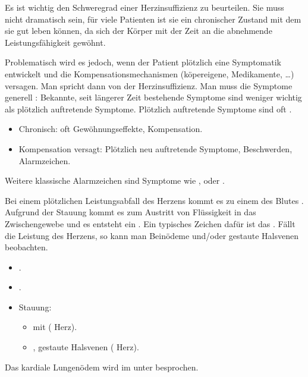 {%
Es ist wichtig den Schweregrad einer Herzinsuffizienz zu beurteilen. Sie
muss nicht dramatisch sein, für viele Patienten ist sie ein
chronischer Zustand mit dem sie gut leben können, da sich
der Körper mit der Zeit an die abnehmende Leistungsfähigkeit
gewöhnt.

Problematisch wird es jedoch, wenn der Patient plötzlich
eine Symptomatik entwickelt und die Kompensationsmechanismen (köpereigene, Medikamente, {\dots})
versagen. Man spricht dann von der 
Herzinsuffizienz. Man muss die Symptome generell : Bekannte, seit längerer Zeit bestehende
Symptome sind weniger wichtig als plötzlich auftretende
Symptome. Plötzlich auftretende Symptome sind oft . 
}{
\begin{itemize}
  \item Chronisch: oft Gewöhnungseffekte, Kompensation.
  \item Kompensation versagt: Plötzlich neu auftretende
  Symptome, Beschwerden, Alarmzeichen.
\end{itemize}
}{}{}{}


{%
Weitere klassische Alarmzeichen sind Symptome wie
,  oder . 

Bei einem plötzlichen
Leistungsabfall des  Herzens kommt es zu einem
 des Blutes . Aufgrund der Stauung
kommt es zum Austritt von Flüssigkeit in das
Zwischengewebe und es entsteht ein
. Ein typisches Zeichen dafür
ist das . Fällt die Leistung des 
Herzens, so kann man Beinödeme und/oder gestaute Halsvenen
beobachten. 
}
{
\begin{itemize}
  \item {}.
  \item  {}.
  \item Stauung:
  \begin{itemize}
    \item {} mit  ( Herz).
    \item {}, gestaute Halsvenen (
    Herz).
  \end{itemize}
\end{itemize}
}{}{}{}


Das kardiale Lungenödem wird im unter
besprochen.

